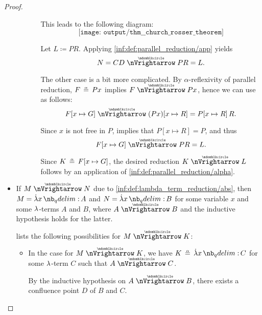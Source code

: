 \begin{proof}
\begin{itemize}
\begin{itemize}
\begin{itemize}
        This leads to the following diagram:
        \begin{equation*}
          \texttt{[image: output/thm\_\_church\_rosser\_theorem]}
        \end{equation*}

        Let \( L \coloneqq PR \). Applying \ref{inf:def:parallel_reduction/app} yields
        \begin{equation*}
          N = CD \ppred PR = L.
        \end{equation*}

        The other case is a bit more complicated. By \( \alpha \)-reflexivity of parallel reduction, \( F \aequiv Px \) implies \( F \ppred Px \), hence we can use  as follows:
        \begin{equation*}
          F[x \mapsto G] \ppred (Px)[x \mapsto R] = P[x \mapsto R] \thinspace R.
        \end{equation*}

        Since \( x \) is not free in \( P \),  implies that \( P[x \mapsto R] = P \), and thus
        \begin{equation*}
          F[x \mapsto G] \ppred PR = L.
        \end{equation*}

        Since \( K \aequiv F[x \mapsto G] \), the desired reduction \( K \ppred L \) follows by an application of \ref{inf:def:parallel_reduction/alpha}.
      \end{itemize}
    \end{itemize}

    \item If \( M \ppred N \) due to \ref{inf:def:lambda_term_reduction/abs}, then \( M = \qabs x A \) and \( N = \qabs x B \) for some variable \( x \) and some \( {\mathrm \lambda} \)-terms \( A \) and \( B \), where \( A \ppred B \) and the inductive hypothesis holds for the latter.

     lists the following possibilities for \( M \ppred K \):
    \begin{itemize}
      \item In the case  for \( M \ppred K \), we have \( K \aequiv \qabs x C \) for some \( {\mathrm \lambda} \)-term \( C \) such that \( A \ppred C \).

      By the inductive hypothesis on \( A \ppred B \), there exists a confluence point \( D \) of \( B \) and \( C \).


\end{itemize}
\end{itemize}
\end{proof}
